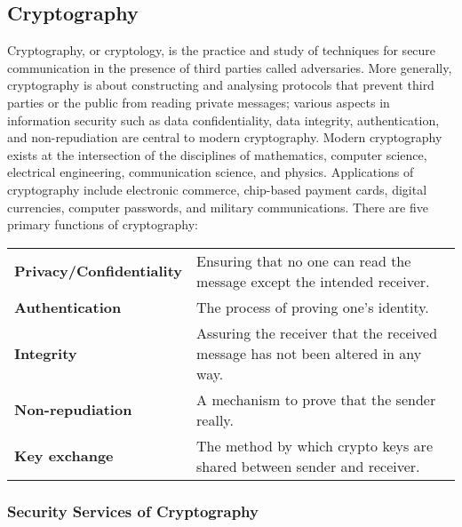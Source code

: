 \documentclass[british]{article}
\providecommand{\tabularnewline}{\\}
\begin{document}
\subsection{Cryptography}

Cryptography, or cryptology, is the practice and study of techniques
for secure communication in the presence of third parties called adversaries.
More generally, cryptography is about constructing and analysing protocols
that prevent third parties or the public from reading private messages;
various aspects in information security such as data confidentiality,
data integrity, authentication, and non-repudiation are central to
modern cryptography. Modern cryptography exists at the intersection
of the disciplines of mathematics, computer science, electrical engineering,
communication science, and physics. Applications of cryptography include
electronic commerce, chip-based payment cards, digital currencies,
computer passwords, and military communications. There are five primary
functions of cryptography:

\medskip{}

\begin{center}
\begin{tabular}{|l||l|}
\hline 
\textbf{\small{}Privacy/Confidentiality} & {\small{}Ensuring that no one can read the message except the intended
receiver.}\tabularnewline
\textbf{\small{}Authentication} & {\small{}The process of proving one's identity.}\tabularnewline
\textbf{\small{}Integrity} & {\small{}Assuring the receiver that the received message has not been
altered in any way.}\tabularnewline
\textbf{\small{}Non-repudiation} & {\small{}A mechanism to prove that the sender really.}\tabularnewline
\textbf{\small{}Key exchange} & {\small{}The method by which crypto keys are shared between sender
and receiver.}\tabularnewline
\hline 
\end{tabular}
\par\end{center}

\medskip{}


\subsubsection{Security Services of Cryptography}
\end{document}
